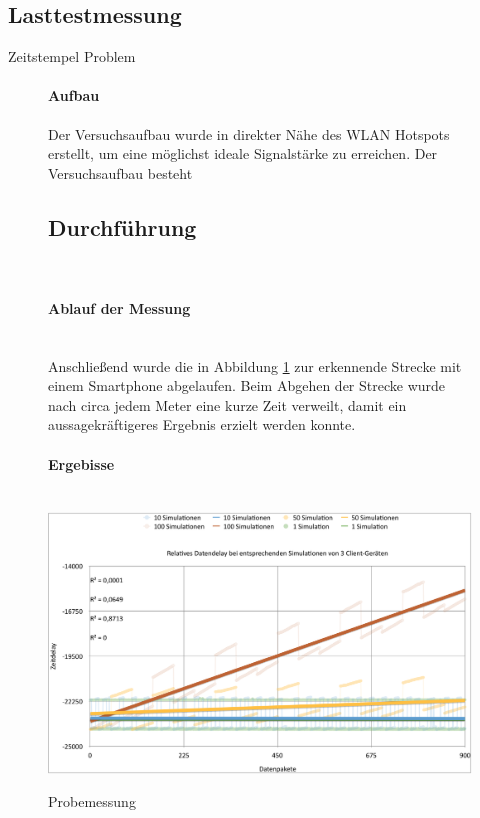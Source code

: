 \documentclass[a4paper]{spie}  %
\begin{document}
\subsection{Lasttestmessung}\label{Lasttestmessung} %
Zeitstempel Problem
\begin{figure}[H]
\vspace{0pt}
\paragraph{Aufbau}
Der Versuchsaufbau wurde in direkter Nähe des WLAN Hotspots erstellt, um eine möglichst ideale Signalstärke zu erreichen. Der Versuchsaufbau besteht
\hfill
\vspace{0pt}

\subsection{Durchführung}\mbox{}\\
\paragraph{Ablauf der Messung}\mbox{}\\
Anschließend wurde die in Abbildung \ref{fig:probeMessung} zur erkennende Strecke mit einem Smartphone abgelaufen. Beim Abgehen der Strecke wurde nach circa jedem Meter eine kurze Zeit verweilt, damit ein aussagekräftigeres Ergebnis erzielt werden konnte.

\paragraph{Ergebisse}\mbox{}\\

\centering
		\includegraphics[width=15cm]{./images/LasttestDiagramm.png}
		\caption{Probemessung}
		\label{fig:probeMessung}
\end{figure}
\end{document}
